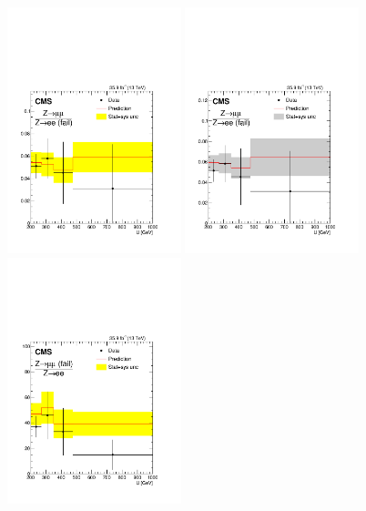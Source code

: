 \begin{figure}
\centering
\includegraphics[width=0.45\textwidth]{figures/pullsImpact/ratio_zmm_zee_fail_shapes_prefit.pdf}
\includegraphics[width=0.45\textwidth]{figures/pullsImpact/ratio_zmm_zee_fail_shapes_fit_b.pdf}\\
\includegraphics[width=0.45\textwidth]{figures/pullsImpact/ratio_zmm_fail_zee_shapes_prefit.pdf}

\end{figure}

